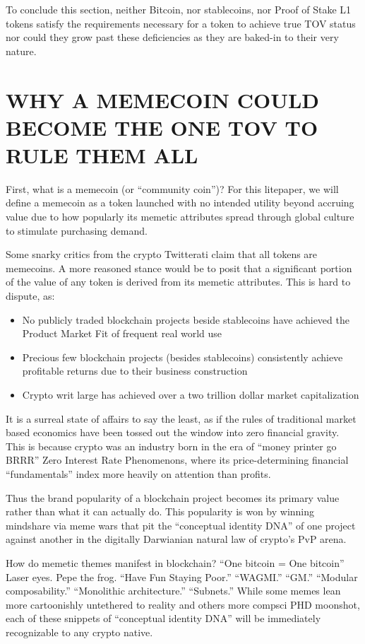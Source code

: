 \documentclass{article}
\begin{document}
To conclude this section, neither Bitcoin, nor stablecoins, nor Proof of Stake L1 tokens satisfy the requirements necessary for a token to achieve true TOV status nor could they grow past these deficiencies as they are baked-in to their very nature.

\section*{WHY A MEMECOIN COULD BECOME THE ONE TOV TO RULE THEM ALL}

First, what is a memecoin (or ``community coin'')? For this litepaper, we will define a memecoin as a token launched with no intended utility beyond accruing value due to how popularly its memetic attributes spread through global culture to stimulate purchasing demand.

Some snarky critics from the crypto Twitterati claim that all tokens are memecoins. A more reasoned stance would be to posit that a significant portion of the value of any token is derived from its memetic attributes. This is hard to dispute, as:

\begin{itemize}
\item No publicly traded blockchain projects beside stablecoins have achieved the Product Market Fit of frequent real world use
\item Precious few blockchain projects (besides stablecoins) consistently achieve profitable returns due to their business construction
\item Crypto writ large has achieved over a two trillion dollar market capitalization
\end{itemize}

It is a surreal state of affairs to say the least, as if the rules of traditional market based economics have been tossed out the window into zero financial gravity. This is because crypto was an industry born in the era of ``money printer go BRRR'' Zero Interest Rate Phenomenons, where its price-determining financial ``fundamentals'' index more heavily on attention than profits.

Thus the brand popularity of a blockchain project becomes its primary value rather than what it can actually do. This popularity is won by winning mindshare via meme wars that pit the ``conceptual identity DNA'' of one project against another in the digitally Darwianian natural law of crypto's PvP arena.

How do memetic themes manifest in blockchain? ``One bitcoin = One bitcoin'' Laser eyes. Pepe the frog. ``Have Fun Staying Poor.'' ``WAGMI.'' ``GM.'' ``Modular composability.'' ``Monolithic architecture.'' ``Subnets.'' While some memes lean more cartoonishly untethered to reality and others more compsci PHD moonshot, each of these snippets of ``conceptual identity DNA'' will be immediately recognizable to any crypto native.
\end{document}
